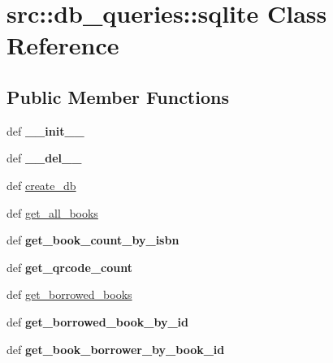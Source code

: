 \hypertarget{classsrc_1_1db__queries_1_1sqlite}{
\section{src::db\_\-queries::sqlite Class Reference}
\label{classsrc_1_1db__queries_1_1sqlite}
}
\subsection*{Public Member Functions}
\begin{DoxyCompactItemize}
\item 
\hypertarget{classsrc_1_1db__queries_1_1sqlite_ab98b135268b3844c18b4384a34f1ee3b}{
def {\bfseries \_\-\_\-init\_\-\_\-}}
\label{classsrc_1_1db__queries_1_1sqlite_ab98b135268b3844c18b4384a34f1ee3b}

\item 
\hypertarget{classsrc_1_1db__queries_1_1sqlite_a5d1b187c0f266098029426fefee03281}{
def {\bfseries \_\-\_\-del\_\-\_\-}}
\label{classsrc_1_1db__queries_1_1sqlite_a5d1b187c0f266098029426fefee03281}

\item 
def \hyperlink{classsrc_1_1db__queries_1_1sqlite_a744842c56e77f063e896780a20c80ecb}{create\_\-db}
\item 
def \hyperlink{classsrc_1_1db__queries_1_1sqlite_afef7eab73809474cab39063009664dbc}{get\_\-all\_\-books}
\item 
\hypertarget{classsrc_1_1db__queries_1_1sqlite_a9549259324efdd907d20ac9d1ed1063d}{
def {\bfseries get\_\-book\_\-count\_\-by\_\-isbn}}
\label{classsrc_1_1db__queries_1_1sqlite_a9549259324efdd907d20ac9d1ed1063d}

\item 
\hypertarget{classsrc_1_1db__queries_1_1sqlite_a7d3a3fb7effb6afed58ea90d456aa889}{
def {\bfseries get\_\-qrcode\_\-count}}
\label{classsrc_1_1db__queries_1_1sqlite_a7d3a3fb7effb6afed58ea90d456aa889}

\item 
def \hyperlink{classsrc_1_1db__queries_1_1sqlite_aad32d22d0cb673c961711c0396d5a26c}{get\_\-borrowed\_\-books}
\item 
\hypertarget{classsrc_1_1db__queries_1_1sqlite_a2d37825bd63dc890c91dd8020d84e0bc}{
def {\bfseries get\_\-borrowed\_\-book\_\-by\_\-id}}
\label{classsrc_1_1db__queries_1_1sqlite_a2d37825bd63dc890c91dd8020d84e0bc}

\item 
\hypertarget{classsrc_1_1db__queries_1_1sqlite_a756f1dd4cba71ee36f075d52f98f982f}{
def {\bfseries get\_\-book\_\-borrower\_\-by\_\-book\_\-id}}
\label{classsrc_1_1db__queries_1_1sqlite_a756f1dd4cba71ee36f075d52f98f982f}


\end{DoxyCompactItemize}
